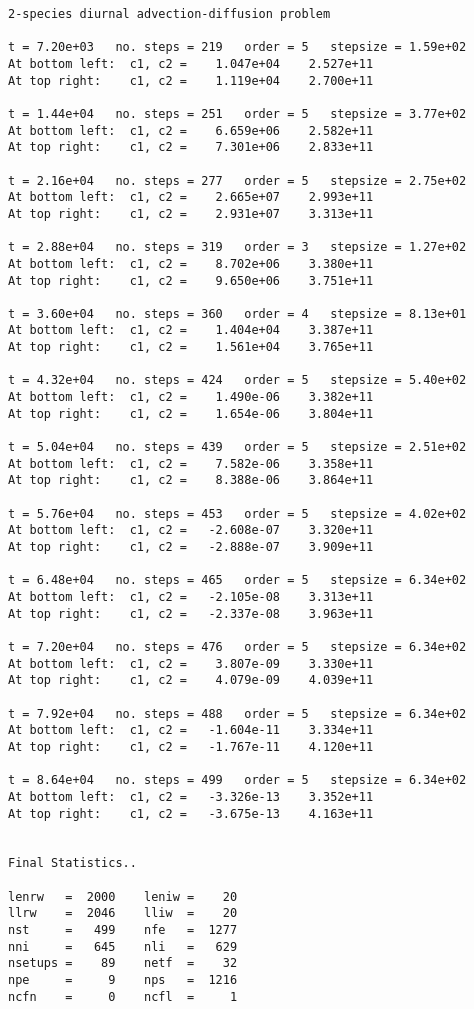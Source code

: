 \begin{verbatim}
2-species diurnal advection-diffusion problem

t = 7.20e+03   no. steps = 219   order = 5   stepsize = 1.59e+02
At bottom left:  c1, c2 =    1.047e+04    2.527e+11 
At top right:    c1, c2 =    1.119e+04    2.700e+11 

t = 1.44e+04   no. steps = 251   order = 5   stepsize = 3.77e+02
At bottom left:  c1, c2 =    6.659e+06    2.582e+11 
At top right:    c1, c2 =    7.301e+06    2.833e+11 

t = 2.16e+04   no. steps = 277   order = 5   stepsize = 2.75e+02
At bottom left:  c1, c2 =    2.665e+07    2.993e+11 
At top right:    c1, c2 =    2.931e+07    3.313e+11 

t = 2.88e+04   no. steps = 319   order = 3   stepsize = 1.27e+02
At bottom left:  c1, c2 =    8.702e+06    3.380e+11 
At top right:    c1, c2 =    9.650e+06    3.751e+11 

t = 3.60e+04   no. steps = 360   order = 4   stepsize = 8.13e+01
At bottom left:  c1, c2 =    1.404e+04    3.387e+11 
At top right:    c1, c2 =    1.561e+04    3.765e+11 

t = 4.32e+04   no. steps = 424   order = 5   stepsize = 5.40e+02
At bottom left:  c1, c2 =    1.490e-06    3.382e+11 
At top right:    c1, c2 =    1.654e-06    3.804e+11 

t = 5.04e+04   no. steps = 439   order = 5   stepsize = 2.51e+02
At bottom left:  c1, c2 =    7.582e-06    3.358e+11 
At top right:    c1, c2 =    8.388e-06    3.864e+11 

t = 5.76e+04   no. steps = 453   order = 5   stepsize = 4.02e+02
At bottom left:  c1, c2 =   -2.608e-07    3.320e+11 
At top right:    c1, c2 =   -2.888e-07    3.909e+11 

t = 6.48e+04   no. steps = 465   order = 5   stepsize = 6.34e+02
At bottom left:  c1, c2 =   -2.105e-08    3.313e+11 
At top right:    c1, c2 =   -2.337e-08    3.963e+11 

t = 7.20e+04   no. steps = 476   order = 5   stepsize = 6.34e+02
At bottom left:  c1, c2 =    3.807e-09    3.330e+11 
At top right:    c1, c2 =    4.079e-09    4.039e+11 

t = 7.92e+04   no. steps = 488   order = 5   stepsize = 6.34e+02
At bottom left:  c1, c2 =   -1.604e-11    3.334e+11 
At top right:    c1, c2 =   -1.767e-11    4.120e+11 

t = 8.64e+04   no. steps = 499   order = 5   stepsize = 6.34e+02
At bottom left:  c1, c2 =   -3.326e-13    3.352e+11 
At top right:    c1, c2 =   -3.675e-13    4.163e+11 


Final Statistics.. 

lenrw   =  2000    leniw =    20
llrw    =  2046    lliw  =    20
nst     =   499    nfe   =  1277
nni     =   645    nli   =   629
nsetups =    89    netf  =    32
npe     =     9    nps   =  1216
ncfn    =     0    ncfl  =     1
\end{verbatim}